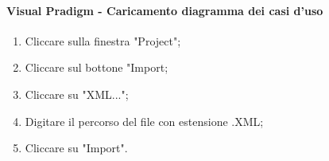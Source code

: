 \paragraph{Visual Pradigm - Caricamento diagramma dei casi d'uso}
\begin{enumerate}
	\item Cliccare sulla finestra "Project";
	\item Cliccare sul bottone "Import;
	\item Cliccare su "XML...";
	\item Digitare il percorso del file con estensione .XML;
	\item Cliccare su "Import".
\end{enumerate}